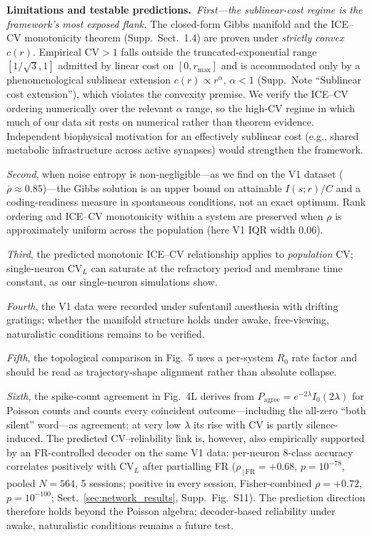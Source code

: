 \textbf{Limitations and testable predictions.}~\emph{First---the sublinear-cost regime is the framework's most exposed flank.}  The closed-form Gibbs manifold and the ICE--CV monotonicity theorem (Supp.~Sect.~1.4) are proven under \emph{strictly convex} $c(r)$.  Empirical CV$>1$ falls outside the truncated-exponential range $[1/\sqrt{3},1]$ admitted by linear cost on $[0,r_{\max}]$ and is accommodated only by a phenomenological sublinear extension $c(r)\propto r^\alpha$, $\alpha<1$ (Supp.~Note ``Sublinear cost extension''), which violates the convexity premise.  We verify the ICE--CV ordering numerically over the relevant $\alpha$ range, so the high-CV regime in which much of our data sit rests on numerical rather than theorem evidence.  Independent biophysical motivation for an effectively sublinear cost (e.g., shared metabolic infrastructure across active synapses) would strengthen the framework.

\emph{Second}, when noise entropy is non-negligible---as we find on the V1 dataset ($\bar\rho\approx 0.85$)---the Gibbs solution is an upper bound on attainable $I(s;r)/C$ and a coding-readiness measure in spontaneous conditions, not an exact optimum.  Rank ordering and ICE--CV monotonicity within a system are preserved when $\rho$ is approximately uniform across the population (here V1 IQR width $0.06$).

\emph{Third}, the predicted monotonic ICE--CV relationship applies to \emph{population} CV; single-neuron $\mathrm{CV}_L$ can saturate at the refractory period and membrane time constant, as our single-neuron simulations show.

\emph{Fourth}, the V1 data were recorded under sufentanil anesthesia with drifting gratings; whether the manifold structure holds under awake, free-viewing, naturalistic conditions remains to be verified.

\emph{Fifth}, the topological comparison in Fig.~5 uses a per-system $R_0$ rate factor and should be read as trajectory-shape alignment rather than absolute collapse.

\emph{Sixth}, the spike-count agreement in Fig.~4L derives from $P_{\mathrm{agree}}=e^{-2\lambda}I_0(2\lambda)$ for Poisson counts and counts every coincident outcome---including the all-zero ``both silent'' word---as agreement; at very low $\lambda$ its rise with CV is partly silence-induced.  The predicted CV--reliability link is, however, also empirically supported by an FR-controlled decoder on the same V1 data: per-neuron 8-class accuracy correlates positively with $\mathrm{CV}_L$ after partialling FR ($\rho_{\,|\,\mathrm{FR}}=+0.68$, $p=10^{-78}$, pooled $N=564$, 5 sessions; positive in every session, Fisher-combined $\rho=+0.72$, $p=10^{-100}$; Sect.~\ref{sec:network_results}, Supp.~Fig.~S11).  The prediction direction therefore holds beyond the Poisson algebra; decoder-based reliability under awake, naturalistic conditions remains a future test.

